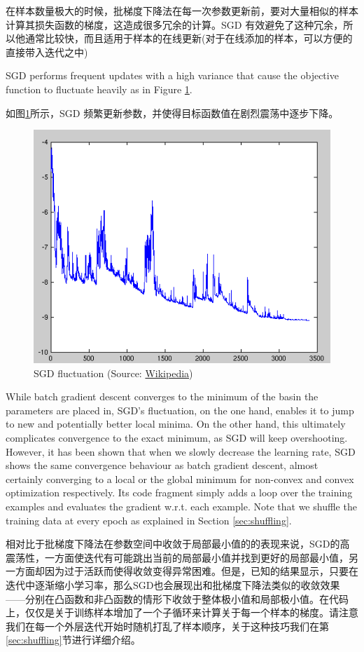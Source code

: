 \documentclass{article}
\begin{document}
在样本数量极大的时候，批梯度下降法在每一次参数更新前，要对大量相似的样本计算其损失函数的梯度，这造成很多冗余的计算。SGD 有效避免了这种冗余，所以他通常比较快，而且适用于样本的在线更新(对于在线添加的样本，可以方便的直接带入迭代之中)

SGD performs frequent updates with a high variance that cause the objective function to fluctuate heavily as in Figure \ref{fig:sgd_fluctuation}.

如图\ref{fig:sgd_fluctuation}所示，SGD 频繁更新参数，并使得目标函数值在剧烈震荡中逐步下降。

\begin{figure}
	\centering
  	\includegraphics[width=0.4\linewidth]{images/sgd_fluctuation.png}
  	\caption{SGD fluctuation (Source: \href{
https://upload.wikimedia.org/wikipedia/commons/f/f3/Stogra.png}{Wikipedia})}
  	\label{fig:sgd_fluctuation}
\end{figure}

While batch gradient descent converges to the minimum of the basin the parameters are placed in, SGD's fluctuation, on the one hand, enables it to jump to new and potentially better local minima. On the other hand, this ultimately complicates convergence to the exact minimum, as SGD will keep overshooting. However, it has been shown that when we slowly decrease the learning rate, SGD shows the same convergence behaviour as batch gradient descent, almost certainly converging to a local or the global minimum for non-convex and convex optimization respectively.
Its code fragment simply adds a loop over the training examples and evaluates the gradient w.r.t. each example. Note that we shuffle the training data at every epoch as explained in Section \ref{sec:shuffling}.

相对比于批梯度下降法在参数空间中收敛于局部最小值的的表现来说，SGD的高震荡性，一方面使迭代有可能跳出当前的局部最小值并找到更好的局部最小值，另一方面却因为过于活跃而使得收敛变得异常困难。但是，已知的结果显示，只要在迭代中逐渐缩小学习率，那么SGD也会展现出和批梯度下降法类似的收敛效果——分别在凸函数和非凸函数的情形下收敛于整体极小值和局部极小值。在代码上，仅仅是关于训练样本增加了一个子循环来计算关于每一个样本的梯度。请注意我们在每一个外层迭代开始时随机打乱了样本顺序，关于这种技巧我们在第\ref{sec:shuffling}节进行详细介绍。
\end{document}
